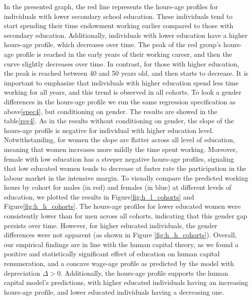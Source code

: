 \documentclass[12pt]{article}
\begin{document}
In the presented graph, the red line represents the hours-age profiles for individuals with lower secondary school education. These individuals tend to start spending their time endowment working earlier compared to those with secondary education. Additionally, individuals with lower education have a higher hours-age profile, which decreases over time. 
The peak of the red group's hours-age profile is reached in the early years of their working career, and then the curve slightly decreases over time. In contrast, for those with higher education, the peak is reached between 40 and 50 years old, and then starts to decrease. 
It is important to emphasize that individuals with higher education spend less time working for all years, and this trend is observed in all cohorts.
\newline
To look a gender differences in the hours-age profile we run the same regression specification as above\ref{spec4}, but conditioning on gender. The results are showed in the table\ref{reg4}. As in the results without conditioning on gender, the slope of the hours-age profile is negative for individual with higher education level. Notwithstanding, for women the slope are flatter across all level of education, meaning that women increases more mildly the time spent working.
Moreover, female with low education has a steeper negative hours-age profiles, signaling that low educated women tends to decrease at faster rate the participation in the labour market in the intensive margin.  
\newline
To visually compare the predicted working hours by cohort for males (in red) and females (in blue) at different levels of education, we plotted the results in Figure\ref{fig:h_l_cohorts} and Figure\ref{fig:h_h_cohorts}. The hours-age profiles for lower educated women were consistently lower than for men across all cohorts, indicating that this gender gap persists over time. However, for higher educated individuals, the gender differences were not apparent (as shown in Figure \ref{fig:h_h_cohorts}).
\newline
Overall, our empirical findings are in line with the human capital theory, as we found a positive and statistically significant effect of education on human capital remuneration, and a concave wage-age profile as predicted by the model with depreciation $\Delta > 0$. Additionally, the hours-age profile supports the human capital model's predictions, with higher educated individuals having an increasing hours-age profile, and lower educated individuals having a decreasing one.
\end{document}
